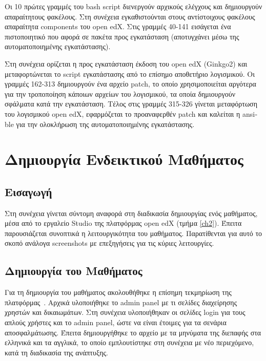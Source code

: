 \documentclass[12pt]{report}
\begin{document}
Οι 10 πρώτες γραμμές του \textlatin{bash script} διενεργούν αρχικούς ελέγχους και δημιουργούν απαραίτητους φακέλους. Στη συνέχεια εγκαθιστούνται στους αντίστοιχους φακέλους απαραίτητα \textlatin{components} του \textlatin{open edX}. Στις γραμμές 40-141 εισάγεται ένα πιστοποιητικό που αφορά σε πακέτα προς εγκατάσταση (αποτυγχάνει μέσω της αυτοματοποιημένης εγκατάστασης).

Στη συνέχεια ορίζεται η προς εγκατάσταση έκδοση του \textlatin{open edX (Ginkgo2)} και μεταφορτώνεται το \textlatin{script} εγκατάστασης από το επίσημο αποθετήριο λογισμικού. Οι γραμμές 162-313 δημιουργούν ένα αρχείο \textlatin{patch}, το οποίο χρησιμοποιείται αργότερα για την τροποποίηση κάποιων αρχείων του λογισμικού, τα οποία δημιουργούν σφάλματα κατά την εγκατάσταση. Τέλος στις γραμμές 315-326 γίνεται μεταφόρτωση του λογισμικού \textlatin{open edX}, εφαρμόζεται το προαναφερθέν \textlatin{patch} και καλείται η \textlatin{ansible} για την ολοκλήρωση της αυτοματοποιημένης εγκατάστασης.

\chapter{Δημιουργία Ενδεικτικού Μαθήματος}\label{ch4}
\section{Εισαγωγή}
Στη συνέχεια γίνεται σύντομη αναφορά στη διαδικασία δημιουργίας ενός μαθήματος, μέσα από το εργαλείο \textlatin{Studio} της πλατφόρμας \textlatin{open edX} (τμήμα \ref{ch2}). Έπειτα παρουσιάζεται συνοπτικά η λειτουργικότητα του μαθήματος. Παρατίθενται για αυτό το σκοπό ανάλογα \textlatin{screenshots} με επεξηγήσεις για τις κύριες λειτουργίες.

\section{Δημιουργία του Μαθήματος}
Για τη δημιουργία του μαθήματος ακολουθήθηκε η επίσημη τεκμηρίωση της πλατφόρμας~\cite{edxdata_package}.
Αρχικά υλοποιήθηκε το \textlatin{admin panel} με τι σελίδες διαχείρησης χρηστών και δικαιωμάτων. Στη συνέχεια υλοποιήθηκαν οι σελίδες \textlatin{login} για τους απλούς χρήστες και το \textlatin{admin panel}, ώστε να είναι έτοιμες για τα σενάρια αποσφαλμάτωσης. Έπειτα δημιουργήθηκε το αρχείο με τα μηνύματα της διεπαφής στα ελληνικά και τα αγγλικά, το οποίο εμπλουτίστηκε στη συνέχεια με νέο περιεχόμενο, κατά τη διαδικασία της ανάπτυξης.
\end{document}
